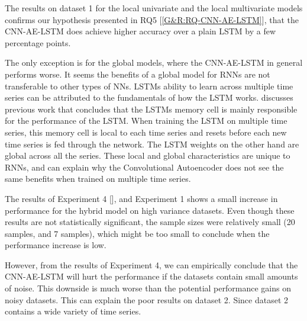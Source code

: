 The results on dataset 1 for the local univariate and the local multivariate models
confirms our hypothesis presented in RQ5 [\ref{G&R:RQ-CNN-AE-LSTM}], that the
CNN-AE-LSTM does achieve higher accuracy over a plain LSTM by a few percentage points.

The only exception is for the global models, where the CNN-AE-LSTM in general performs worse.
It seems the benefits of a global model for RNNs are not transferable to other types
of NNs. LSTMs ability to learn across multiple time series can be attributed to the fundamentals
of how the LSTM works. \cite{Zhao2019} discusses previous work that concludes that
the LSTMs memory cell is mainly responsible for the performance of the LSTM.
When training the LSTM on multiple time series, this memory cell is local to each
time series and resets before each new time series is fed through the network.
The LSTM weights on the other hand are global across all the series.
These local and global characteristics are unique to RNNs, and can explain
why the Convolutional Autoencoder does not see the same benefits when trained on multiple
time series.

The results of Experiment 4 [],
and Experiment 1 shows a small increase in performance for the hybrid model on high variance datasets.
Even though these results are not statistically significant, the sample sizes were relatively small
(20 samples, and 7 samples), which might be too small to conclude when the
performance increase is low.

However, from the results of Experiment 4, we can empirically conclude that the CNN-AE-LSTM will
hurt the performance if the datasets contain small amounts of noise. This downside is much
worse than the potential performance gains on noisy datasets.
This can explain the poor results on dataset 2. Since dataset 2 contains a wide variety
of time series.




